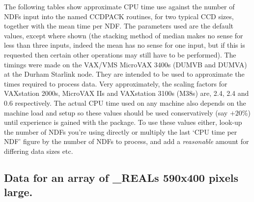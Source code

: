 The following tables show approximate CPU time use against the number
of NDFs input into the named CCDPACK routines, for two typical CCD
sizes, together with the mean time per NDF. The parameters used are the
default values, except where shown (the stacking method of median makes
no sense for less than three inputs, indeed the mean has no sense for
one input, but if this is requested then certain other operations may
still have to be performed). The timings were made on the  VAX/VMS
MicroVAX 3400s (DUMVB and DUMVA) at the Durham Starlink node. They are
intended to be used to approximate the times required to process data.
Very approximately, the scaling factors for VAXstation 2000s, MicroVAX
IIs and VAXstation 3100s (M38s) are, 2.4, 2.4 and 0.6 respectively. The
actual CPU time used on any machine also depends on the machine load
and setup so these values should be used conservatively (say $+20$\%)
until experience is gained with the package. To use these values
either, look-up the number of NDFs you're using directly or multiply
the last `CPU time per NDF' figure by the number of NDFs to process,
and add a {\em reasonable} amount for differing data sizes etc.

\begin{center}
\section*{Data for an array of \_REALs 590x400 pixels large.}
\end{center}


